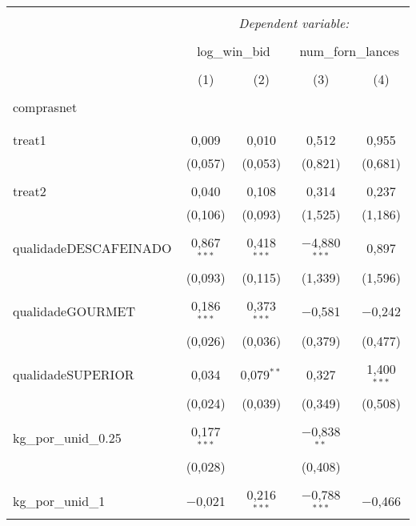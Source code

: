 
\begin{table}[!htbp] \centering 
  \caption{} 
  \label{} 
\begin{tabular}{@{\extracolsep{5pt}}lcccc} 
\\[-1.8ex]\hline 
\hline \\[-1.8ex] 
 & \multicolumn{4}{c}{\textit{Dependent variable:}} \\ 
\cline{2-5} 
\\[-1.8ex] & \multicolumn{2}{c}{log\_win\_bid} & \multicolumn{2}{c}{num\_forn\_lances} \\ 
\\[-1.8ex] & (1) & (2) & (3) & (4)\\ 
\hline \\[-1.8ex] 
 comprasnet &  &  &  &  \\ 
  &  &  &  &  \\ 
  & & & & \\ 
 treat1 & 0,009 & 0,010 & 0,512 & 0,955 \\ 
  & (0,057) & (0,053) & (0,821) & (0,681) \\ 
  & & & & \\ 
 treat2 & 0,040 & 0,108 & 0,314 & 0,237 \\ 
  & (0,106) & (0,093) & (1,525) & (1,186) \\ 
  & & & & \\ 
 qualidadeDESCAFEINADO & 0,867$^{***}$ & 0,418$^{***}$ & $-$4,880$^{***}$ & 0,897 \\ 
  & (0,093) & (0,115) & (1,339) & (1,596) \\ 
  & & & & \\ 
 qualidadeGOURMET & 0,186$^{***}$ & 0,373$^{***}$ & $-$0,581 & $-$0,242 \\ 
  & (0,026) & (0,036) & (0,379) & (0,477) \\ 
  & & & & \\ 
 qualidadeSUPERIOR & 0,034 & 0,079$^{**}$ & 0,327 & 1,400$^{***}$ \\ 
  & (0,024) & (0,039) & (0,349) & (0,508) \\ 
  & & & & \\ 
 kg\_por\_unid\_0.25 & 0,177$^{***}$ &  & $-$0,838$^{**}$ &  \\ 
  & (0,028) &  & (0,408) &  \\ 
  & & & & \\ 
 kg\_por\_unid\_1 & $-$0,021 & 0,216$^{***}$ & $-$0,788$^{***}$ & $-$0,466 \\ 

\end{tabular}
\end{table}
